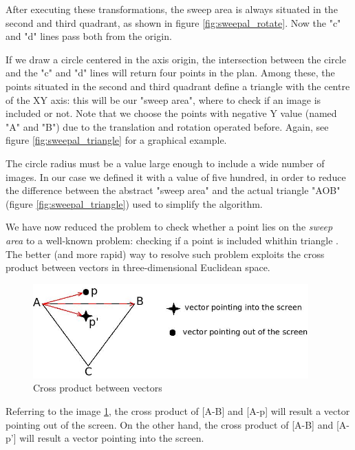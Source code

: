 %
After executing these transformations, the sweep area is always 
situated in the second and third quadrant, as 
shown in figure \ref{fig:sweepal_rotate}. Now the "c" and "d" 
lines pass both from the origin.
%

%
If we draw a circle centered in the axis origin, the intersection 
between the circle and the "c" and "d" lines will
return four points in the plan. Among these, the points situated 
in the second and third quadrant define a triangle
with the centre of the XY axis: this will be our "sweep area", 
where to check if an image is included or not. Note
that we choose the points with negative Y value (named "A" and "B") 
due to the translation and rotation operated
before. Again, see figure \ref{fig:sweepal_triangle} 
for a graphical example.
%

%
The circle radius must be a value large enough to include a wide 
number of images. In our case we defined it with a
value of five hundred, in order to reduce the difference between 
the abstract "sweep area" and the actual triangle 
"AOB" (figure \ref{fig:sweepal_triangle}) used to simplify the algorithm.
%

%
We have now reduced the problem to check whether a point 
lies on the \textit{sweep area} to a well-known problem:
checking if a point is included whithin triangle
\cite{withinboundaries:pointintriangle}. 
%
The better (and more rapid) way to resolve such problem 
exploits the cross product between vectors
in three-dimensional Euclidean space.
%
\begin{figure}[!h]
  \begin{center}
    \includegraphics[width=300pt]{img/sweepal_crossproductABC.jpeg} 
    \caption{Cross product between vectors}
    \label{fig:sweepal_crossproductABC}
  \end{center}
\end{figure}
Referring to the image \ref{fig:sweepal_crossproductABC}, the cross product of [A-B] and [A-p] will result a vector
pointing out of the screen. On the other hand, the cross product of [A-B] and [A-p'] will result a vector pointing
into the screen.
%

